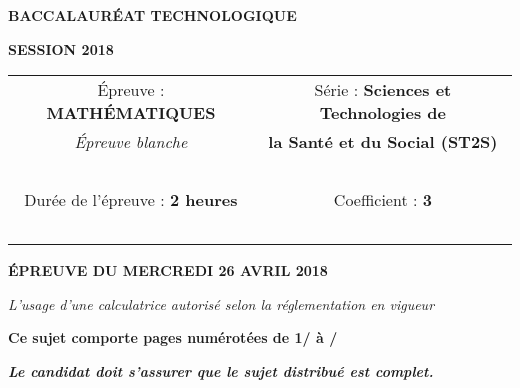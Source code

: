 \begin{center}
	
	{\scshape\LARGE \textbf{BACCALAUR\'EAT TECHNOLOGIQUE} \par}
	\vspace{1cm}
	{\scshape\Large \textbf{SESSION 2018}\par}
	\vspace{1.5cm}
	

	\begin{large}
		\begin{tabular}{|@{\ }c@{\ }|@{\ }c@{\ }|}
		\hline
		\'Epreuve : \textbf{MATH\'EMATIQUES} & Série : \textbf{Sciences et Technologies de}  \\ 
		\textit{\'Epreuve blanche}&  \textbf{la Santé et du Social (ST2S)} \\ \hline
		\ & \ \\
		Durée de l'épreuve : \textbf{2 heures} & Coefficient : \textbf{3} \\ 
		\ & \ \\
		\hline
	\end{tabular}
	\end{large}
		
	\vspace{1cm}
	{\large\bfseries \'EPREUVE DU MERCREDI 26 AVRIL 2018}
	
	\vspace{1cm}
	{\itshape L'usage d'une calculatrice autorisé selon la réglementation en vigueur\par}
	\vspace{1.5cm}
	{\bfseries Ce sujet comporte \pageref{LastPage} pages numérotées de 1/\pageref{LastPage} à \pageref{LastPage}/\pageref{LastPage} }
	
	
	\vspace{0.5cm}
	{\bfseries\itshape Le candidat doit s'assurer que le sujet distribué est complet. }
	
	\vfill	
	
	
	\vfill

\end{center}
\newpage